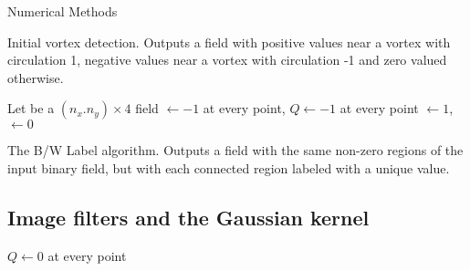 \begin{chapter}{\label{cha:numerics}Numerical Methods}
\begin{algorithm}[H]
\caption{Initial vortex detection. Outputs a field with positive values near a vortex with circulation 1, negative values near a vortex with circulation -1 and zero valued otherwise.}\label{algo_calcvortexfield}
\end{algorithm}



	\begin{algorithm}[H]
	\BlankLine
	Let \Linked be a $(n_x.n_y) \times 4$ field\;
	\Linked$\leftarrow -1$ at every point, $Q\leftarrow -1$ at every point\;
	\Lc$\leftarrow 1$, \Rc$\leftarrow 0$\;



\caption{The B/W Label algorithm. Outputs a field with the same non-zero regions of the input binary field, but with each connected region labeled with a unique value.}\label{algo_bwlabel}
\end{algorithm}


	\subsection{\label{section:gaussianblur} Image filters and the Gaussian kernel}
		\begin{algorithm}[H]
		\BlankLine
		$Q\leftarrow0$ at every point\;


\end{algorithm}
\end{chapter}
